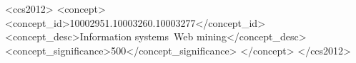 \documentclass[sigconf]{acmart}
\begin{document}
\begin{CCSXML}
<ccs2012>
<concept>
<concept_id>10002951.10003260.10003277</concept_id>
<concept_desc>Information systems~Web mining</concept_desc>
<concept_significance>500</concept_significance>
</concept>
</ccs2012>
\end{CCSXML}



\maketitle













\end{document}
